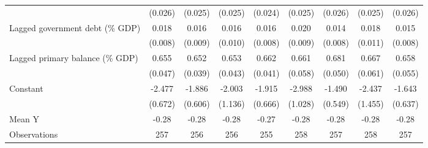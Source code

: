 {\begin{tabular}{l*{8}{c}}
                    &     (0.026)         &     (0.025)         &     (0.025)         &     (0.024)         &     (0.025)         &     (0.026)         &     (0.025)         &     (0.026)         \\
\addlinespace
Lagged government debt (\% GDP)&       0.018\sym{**} &       0.016\sym{*}  &       0.016         &       0.016\sym{*}  &       0.020\sym{**} &       0.014\sym{*}  &       0.018         &       0.015\sym{*}  \\
                    &     (0.008)         &     (0.009)         &     (0.010)         &     (0.008)         &     (0.009)         &     (0.008)         &     (0.011)         &     (0.008)         \\
\addlinespace
Lagged primary balance (\% GDP)&       0.655\sym{***}&       0.652\sym{***}&       0.653\sym{***}&       0.662\sym{***}&       0.661\sym{***}&       0.681\sym{***}&       0.667\sym{***}&       0.658\sym{***}\\
                    &     (0.047)         &     (0.039)         &     (0.043)         &     (0.041)         &     (0.058)         &     (0.050)         &     (0.061)         &     (0.055)         \\
\addlinespace
Constant            &      -2.477\sym{***}&      -1.886\sym{***}&      -2.003         &      -1.915\sym{**} &      -2.988\sym{**} &      -1.490\sym{**} &      -2.437         &      -1.643\sym{**} \\
                    &     (0.672)         &     (0.606)         &     (1.136)         &     (0.666)         &     (1.028)         &     (0.549)         &     (1.455)         &     (0.637)         \\
\midrule
Mean Y              &       -0.28         &       -0.28         &       -0.28         &       -0.27         &       -0.28         &       -0.28         &       -0.28         &       -0.28         \\
Observations        &         257         &         256         &         256         &         255         &         258         &         257         &         258         &         257         \\
\bottomrule
\end{tabular}
}

